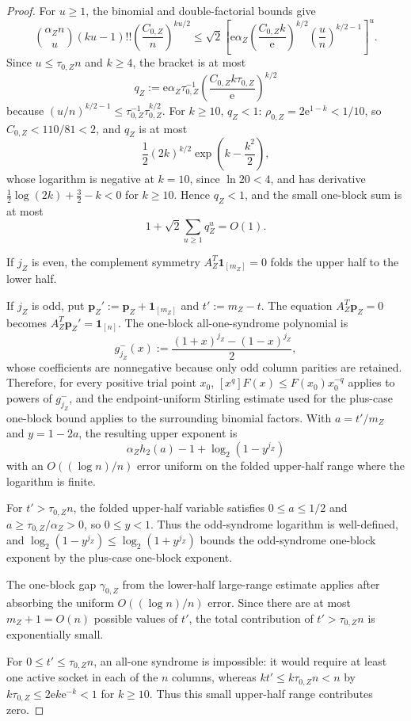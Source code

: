 \documentclass[11pt]{article}
\theoremstyle{definition}
\newcommand{\bp}{\mathbf p}
\newcommand{\ones}{\mathbf 1}
\newcommand{\h}{h_2}
\begin{document}
\begin{proof}
For \(u\ge1\), the binomial and double-factorial bounds give
\[
\binom{\alpha_Z n}{u}(ku-1)!!
\left(\frac{C_{0,Z}}{n}\right)^{ku/2}
\le
\sqrt2\left[
\mathrm{e}\alpha_Z
\left(\frac{C_{0,Z}k}{\mathrm{e}}\right)^{k/2}
\left(\frac{u}{n}\right)^{k/2-1}
\right]^u.
\]
Since \(u\le\tau_{0,Z}n\) and \(k\ge4\), the bracket is at most
\[
q_Z:=
\mathrm{e}\alpha_Z\tau_{0,Z}^{-1}
\left(\frac{C_{0,Z}k\tau_{0,Z}}{\mathrm{e}}\right)^{k/2}
\]
because \((u/n)^{k/2-1}\le \tau_{0,Z}^{-1}\tau_{0,Z}^{k/2}\).
For \(k\ge10\), \(q_Z<1\): \(\rho_{0,Z}=2\mathrm{e}^{1-k}<1/10\), so
\(C_{0,Z}<110/81<2\), and \(q_Z\) is at most
\[
\frac12(2k)^{k/2}\exp\!\left(k-\frac{k^2}{2}\right),
\]
whose logarithm is negative at \(k=10\), since \(\ln20<4\), and has derivative \(\frac12\log(2k)+\frac32-k<0\) for \(k\ge10\). Hence \(q_Z<1\), and the small one-block sum is at most
\[
1+\sqrt2\sum_{u\ge1}q_Z^u=O(1).
\]

If \(j_Z\) is even, the complement symmetry \(A_Z^T\ones_{[m_Z]}=0\) folds the upper half to the lower half.

If \(j_Z\) is odd, put \(\bp_Z':=\bp_Z+\ones_{[m_Z]}\) and \(t':=m_Z-t\). The equation \(A_Z^T\bp_Z=0\) becomes \(A_Z^T\bp_Z'=\ones_{[n]}\). The one-block all-one-syndrome polynomial is
\[
g^-_{j_Z}(x):=\frac{(1+x)^{j_Z}-(1-x)^{j_Z}}{2},
\]
whose coefficients are nonnegative because only odd column parities are retained. Therefore, for every positive trial point \(x_0\),
\([x^q]F(x)\le F(x_0)x_0^{-q}\) applies to powers of \(g^-_{j_Z}\), and the endpoint-uniform Stirling estimate used for the plus-case one-block bound applies to the surrounding binomial factors. With \(a=t'/m_Z\) and \(y=1-2a\), the resulting upper exponent is
\[
\alpha_Z\h(a)-1+\log_2(1-y^{j_Z})
\]
with an \(O((\log n)/n)\) error uniform on the folded upper-half range where the logarithm is finite.

For \(t'>\tau_{0,Z}n\), the folded upper-half variable satisfies \(0\le a\le1/2\) and \(a\ge\tau_{0,Z}/\alpha_Z>0\), so \(0\le y<1\). Thus the odd-syndrome logarithm is well-defined, and \(\log_2(1-y^{j_Z})\le \log_2(1+y^{j_Z})\) bounds the odd-syndrome one-block exponent by the plus-case one-block exponent.

The one-block gap \(\gamma_{0,Z}\) from the lower-half large-range estimate applies after absorbing the uniform \(O((\log n)/n)\) error. Since there are at most \(m_Z+1=O(n)\) possible values of \(t'\), the total contribution of \(t'>\tau_{0,Z}n\) is exponentially small.

For \(0\le t'\le\tau_{0,Z}n\), an all-one syndrome is impossible: it would require at least one active socket in each of the \(n\) columns, whereas \(kt'\le k\tau_{0,Z}n<n\) by \(k\tau_{0,Z}\le2\mathrm{e} k\mathrm{e}^{-k}<1\) for \(k\ge10\). Thus this small upper-half range contributes zero.


\end{proof}
\end{document}
